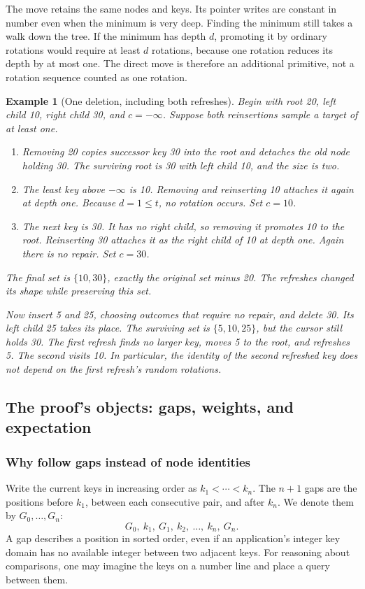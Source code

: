 \documentclass[11pt,a4paper]{article}
\theoremstyle{readable}
\newtheorem{example}[theorem]{Example}
\begin{document}
The move retains the same nodes and keys. Its pointer writes are
constant in number even when the minimum is very deep. Finding the
minimum still takes a walk down the tree. If the minimum has depth
$d$, promoting it by ordinary rotations would require at least $d$
rotations, because one rotation reduces its depth by at most one.
The direct move is therefore an additional primitive, not a rotation
sequence counted as one rotation.

\begin{example}[One deletion, including both refreshes]
Begin with root 20, left child 10, right child 30, and $c=-\infty$.
Suppose both reinsertions sample a target of at least one.
\begin{enumerate}
  \item Removing 20 copies successor key 30 into the root and detaches
        the old node holding 30. The surviving root is 30 with left
        child 10, and the size is two.
  \item The least key above $-\infty$ is 10. Removing and reinserting
        10 attaches it again at depth one. Because $d=1\le t$, no
        rotation occurs. Set $c=10$.
  \item The next key is 30. It has no right child, so removing it
        promotes 10 to the root. Reinserting 30 attaches it as the
        right child of 10 at depth one. Again there is no repair.
        Set $c=30$.
\end{enumerate}
The final set is $\{10,30\}$, exactly the original set minus 20.
The refreshes changed its shape while preserving this set.

Now insert 5 and 25, choosing outcomes that require no repair, and
delete 30. Its left child 25 takes its place. The surviving set is
$\{5,10,25\}$, but the cursor still holds 30. The first refresh finds
no larger key, moves 5 to the root, and refreshes 5. The second visits
10. In particular, the identity of the second refreshed key does not
depend on the first refresh's random rotations.
\end{example}

\subsection{The proof's objects: gaps, weights, and expectation}
\label{sec:probability}

\subsubsection*{Why follow gaps instead of node identities}
Write the current keys in increasing order as $k_1<\cdots<k_n$.
The $n+1$ gaps are the positions before $k_1$, between each consecutive
pair, and after $k_n$. We denote them by $G_0,\ldots,G_n$:
\[
  G_0,\ k_1,\ G_1,\ k_2,\ \ldots,\ k_n,\ G_n.
\]
A gap describes a position in sorted order, even if an application's
integer key domain has no available integer between two adjacent keys.
For reasoning about comparisons, one may imagine the keys on a number
line and place a query between them.
\end{document}
